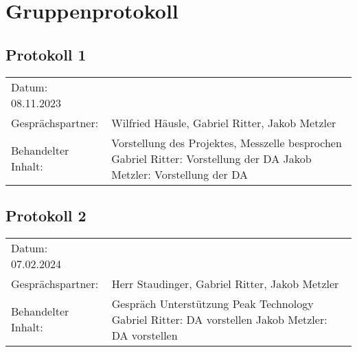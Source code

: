 \chapter{Gruppenprotokoll}

\section*{Protokoll 1}

\begin{tabular}{p{} p{}}
	Datum: 08.11.2023 \\
	Gesprächspartner: & Wilfried Häusle, Gabriel Ritter, Jakob Metzler \\
	Behandelter Inhalt: & Vorstellung des Projektes, Messzelle besprochen \newline
	Gabriel Ritter: Vorstellung der DA \newline
	Jakob Metzler: Vorstellung der DA \newline
\end{tabular}

\section*{Protokoll 2}

\begin{tabular}{p{} p{}}
	Datum: 07.02.2024 \\
	Gesprächspartner: & Herr Staudinger, Gabriel Ritter, Jakob Metzler \\
	Behandelter Inhalt: & Gespräch Unterstützung Peak Technology \newline
	Gabriel Ritter: DA vorstellen \newline
	Jakob Metzler: DA vorstellen \newline
\end{tabular}
